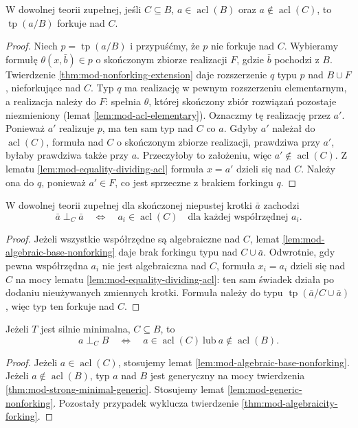 \begin{twierdzenie}
\label{thm:mod-algebraicity-forking}
W dowolnej teorii zupełnej, jeśli $C\subseteq B$,
$a\in\operatorname{acl}(B)$ oraz
$a\notin\operatorname{acl}(C)$,
to $\operatorname{tp}(a/B)$ forkuje nad $C$.
\end{twierdzenie}
\begin{proof}
Niech $p=\operatorname{tp}(a/B)$
i przypuśćmy, że $p$ nie forkuje nad $C$.
Wybieramy formułę $\theta(x,\bar b)\in p$
o skończonym zbiorze realizacji $F$,
gdzie $\bar b$ pochodzi z $B$.
Twierdzenie \ref{thm:mod-nonforking-extension}
daje rozszerzenie $q$ typu $p$ nad $B\cup F$,
nieforkujące nad $C$.
Typ $q$ ma realizację w pewnym rozszerzeniu
elementarnym, a realizacja należy do $F$:
spełnia $\theta$, której skończony zbiór
rozwiązań pozostaje niezmieniony
(lemat \ref{lem:mod-acl-elementary}).
Oznaczmy tę realizację przez $a'$.
Ponieważ $a'$ realizuje $p$,
ma ten sam typ nad $C$ co $a$.
Gdyby $a'$ należał do $\operatorname{acl}(C)$,
formuła nad $C$ o skończonym zbiorze realizacji,
prawdziwa przy $a'$, byłaby prawdziwa także przy $a$.
Przeczyłoby to założeniu, więc
$a'\notin\operatorname{acl}(C)$.
Z lematu \ref{lem:mod-equality-dividing-acl}
formuła $x=a'$ dzieli się nad $C$.
Należy ona do $q$, ponieważ $a'\in F$,
co jest sprzeczne z brakiem forkingu $q$.
\end{proof}

\begin{wniosek}
\label{cor:mod-forking-self-algebraic}
W dowolnej teorii zupełnej dla skończonej
niepustej krotki $\bar a$ zachodzi
\[
\bar a\mathrel{\perp_C}\bar a
\quad\Longleftrightarrow\quad
a_i\in\operatorname{acl}(C)
\quad\text{dla każdej współrzędnej }a_i.
\]
\end{wniosek}
\begin{proof}
Jeżeli wszystkie współrzędne są algebraiczne
nad $C$, lemat \ref{lem:mod-algebraic-base-nonforking}
daje brak forkingu typu nad $C\cup\bar a$.
Odwrotnie, gdy pewna współrzędna $a_i$
nie jest algebraiczna nad $C$, formuła
$x_i=a_i$ dzieli się nad $C$ na mocy
lematu \ref{lem:mod-equality-dividing-acl}:
ten sam świadek działa po dodaniu nieużywanych
zmiennych krotki. Formuła należy do typu
$\operatorname{tp}(\bar a/C\cup\bar a)$,
więc typ ten forkuje nad $C$.
\end{proof}

\begin{wniosek}
\label{cor:mod-strong-minimal-forking}
Jeżeli $T$ jest silnie minimalna, $C\subseteq B$,
to
\[
a\mathrel{\perp_C}B
\quad\Longleftrightarrow\quad
a\in\operatorname{acl}(C)
\ \text{lub}\ a\notin\operatorname{acl}(B).
\]
\end{wniosek}
\begin{proof}
Jeżeli $a\in\operatorname{acl}(C)$,
stosujemy lemat
\ref{lem:mod-algebraic-base-nonforking}.
Jeżeli $a\notin\operatorname{acl}(B)$,
typ $a$ nad $B$ jest generyczny na mocy
twierdzenia \ref{thm:mod-strong-minimal-generic}.
Stosujemy lemat \ref{lem:mod-generic-nonforking}.
Pozostały przypadek wyklucza twierdzenie
\ref{thm:mod-algebraicity-forking}.
\end{proof}

